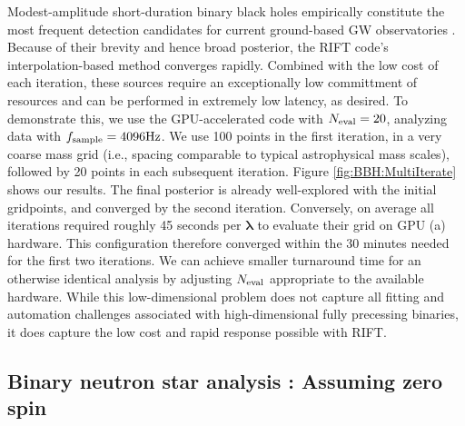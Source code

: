 \documentclass[twocolumn,prd,nofootinbib]{revtex4}
\newcommand\unit[1]{{\rm #1}}
\begin{document}
Modest-amplitude short-duration binary black holes empirically constitute the most frequent detection candidates
for current ground-based GW observatories \cite{LIGO-O2-Catalog}.    Because of their brevity and hence broad posterior,
the RIFT code's interpolation-based method converges  rapidly.  Combined with the low cost of each iteration,
these sources require an exceptionally low committment of resources and can be performed in extremely low latency, as
desired.
To demonstrate this, we use the GPU-accelerated code with $N_{\rm eval}=20$, analyzing data with $f_{\rm
  sample}=4096\unit{Hz}$.    We use 100 points in the first iteration, in a very coarse mass  grid (i.e., spacing
comparable to typical astrophysical mass scales), followed by 20 points in each subsequent iteration.  Figure \ref{fig:BBH:MultiIterate} shows our results.   The
final posterior is already well-explored with the initial gridpoints, and converged by the second iteration.  
Conversely, on average all iterations required roughly 45 seconds per $\bm{\lambda}$ to evaluate their grid on GPU (a) hardware.  This
configuration therefore converged within the 30 minutes needed for the first two iterations.    We can achieve  smaller turnaround time for an otherwise identical analysis by adjusting $N_{\rm eval}$ appropriate to the available hardware.
%
While this low-dimensional problem does not capture all  fitting and automation challenges associated with high-dimensional
 fully precessing binaries, it does capture the low cost and rapid response possible with RIFT.






\subsection{Binary neutron star analysis : Assuming  zero spin}
\label{sec:sub:BNSFull}
\end{document}
